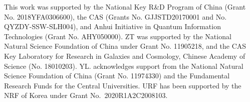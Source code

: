 \documentclass[prl,twocolumn,superscriptaddress,floatfix,showpacs,amsmath,longbibliography,nofootinbib,amssymb]{revtex4-1}
\begin{document}
\begin{acknowledgments}
This work was supported by the National Key R\&D Program of China (Grant No. 2018YFA0306600), the CAS (Grants No. GJJSTD20170001 and No. QYZDY-SSW-SLH004), and Anhui Initiative in Quantum Information Technologies (Grant No. AHY050000).  
ZT was supported by the National Natural Science Foundation of 
China under Grant No. 11905218, and the CAS Key Laboratory for Research in Galaxies and Cosmology, Chinese Academy of Science (No. 18010203). YL. acknowledges support from the National Natural Science Foundation of China (Grant No. 11974330) and the Fundamental Research Funds for the Central Universities. 
URF has been supported by the NRF of Korea under Grant No.~2020R1A2C2008103. 

\end{acknowledgments}



\end{document}
